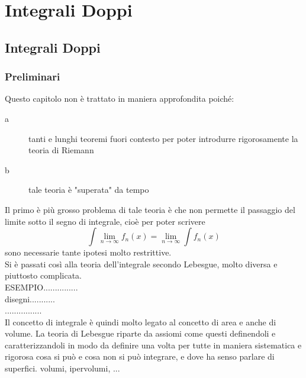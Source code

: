 \part{Integrali Doppi}
\chapter{Integrali Doppi}
\section*{Preliminari}
Questo capitolo non è trattato in maniera approfondita poiché:
\begin{description}
	\item[a] tanti e lunghi teoremi fuori contesto per poter introdurre rigorosamente la teoria di Riemann
	\item[b] tale teoria è "superata" da tempo
\end{description}
Il primo è più grosso problema di tale teoria è che non permette il passaggio del limite sotto il segno di integrale, cioè per poter scrivere 
$$ \int\lim\limits_{n\to\infty}f_n(x) = \lim\limits_{n\to\infty}\int f_n(x)$$ sono necessarie tante ipotesi molto restrittive.\\
Si è passati così alla teoria dell'integrale secondo Lebesgue, molto diversa e piuttosto complicata.\\
ESEMPIO...............\\
disegni...........\\
................\\
Il concetto di integrale è quindi molto legato al concetto di area e anche di volume. La teoria di Lebesgue riparte da assiomi come questi definendoli e caratterizzandoli in modo da definire una volta per tutte in maniera sistematica e rigorosa cosa si può e cosa non si può integrare, e dove ha senso parlare di superfici. volumi, ipervolumi, ... 
